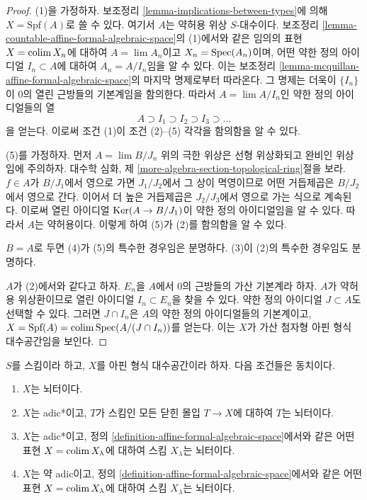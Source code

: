 \begin{proof}
(1)을 가정하자. 보조정리 \ref{lemma-implications-between-types}에 의해
$X = \text{Spf}(A)$로 쓸 수 있다. 여기서 $A$는 약허용 위상
$S$-대수이다. 보조정리
\ref{lemma-countable-affine-formal-algebraic-space}의 (1)에서와 같은
임의의 표현 $X = \mathop{\mathrm{colim}}\nolimits X_n$에 대하여 $A = \lim A_n$이고
$X_n = \mathop{\mathrm{Spec}}(A_n)$이며, 어떤 약한 정의 아이디얼 $I_n \subset A$에
대하여 $A_n = A/I_n$임을 알 수 있다. 이는 보조정리
\ref{lemma-mcquillan-affine-formal-algebraic-space}의 마지막 명제로부터
따라온다. 그 명제는 더욱이 $\{I_n\}$이 $0$의 열린 근방들의 기본계임을
함의한다. 따라서 $A = \lim A/I_n$인 약한 정의 아이디얼들의 열
$$
A \supset I_1 \supset I_2 \supset I_3 \supset \ldots
$$
을 얻는다. 이로써 조건 (1)이 조건 (2)--(5) 각각을 함의함을 알 수 있다.

\medskip\noindent
(5)를 가정하자. 먼저 $A = \lim B/J_n$ 위의 극한 위상은 선형
위상화되고 완비인 위상임에 주의하자. 대수학 심화, 제
\ref{more-algebra-section-topological-ring}절을 보라. $f \in A$가
$B/J_1$에서 영으로 가면 $J_1/J_2$에서 그 상이 멱영이므로 어떤
거듭제곱은 $B/J_2$에서 영으로 간다. 이어서 더 높은 거듭제곱은
$J_2/J_3$에서 영으로 가는 식으로 계속된다. 이로써 열린 아이디얼
$\mathop{\mathrm{Ker}}(A \to B/J_1)$이 약한 정의 아이디얼임을 알 수 있다. 따라서
$A$는 약허용이다. 이렇게 하여 (5)가 (2)를 함의함을 알 수 있다.

\medskip\noindent
$B = A$로 두면 (4)가 (5)의 특수한 경우임은 분명하다. (3)이 (2)의
특수한 경우임도 분명하다.

\medskip\noindent
$A$가 (2)에서와 같다고 하자. $E_n$을 $A$에서 $0$의 근방들의 가산
기본계라 하자. $A$가 약허용 위상환이므로 열린 아이디얼
$I_n \subset E_n$을 찾을 수 있다. 약한 정의 아이디얼 $J \subset A$도
선택할 수 있다. 그러면 $J \cap I_n$은 $A$의 약한 정의 아이디얼들의
기본계이고,
$X = \text{Spf}(A) = \mathop{\mathrm{colim}}\nolimits \mathop{\mathrm{Spec}}(A/(J \cap I_n))$를 얻는다.
이는 $X$가 가산 첨자형 아핀 형식 대수공간임을 보인다.
\end{proof}

\begin{lemma}
\label{lemma-characterize-noetherian-affine}
$S$를 스킴이라 하고, $X$를 아핀 형식 대수공간이라 하자. 다음
조건들은 동치이다.
\begin{enumerate}
\item $X$는 뇌터이다.
\item $X$는 adic*이고, $T$가 스킴인 모든 닫힌 몰입 $T \to X$에
대하여 $T$는 뇌터이다.
\item $X$는 adic*이고, 정의
\ref{definition-affine-formal-algebraic-space}에서와 같은 어떤 표현
$X = \mathop{\mathrm{colim}}\nolimits X_\lambda$에 대하여 스킴 $X_\lambda$는 뇌터이다.
\item $X$는 약 adic이고, 정의
\ref{definition-affine-formal-algebraic-space}에서와 같은 어떤 표현
$X = \mathop{\mathrm{colim}}\nolimits X_\lambda$에 대하여 스킴 $X_\lambda$는 뇌터이다.
\end{enumerate}
\end{lemma}

